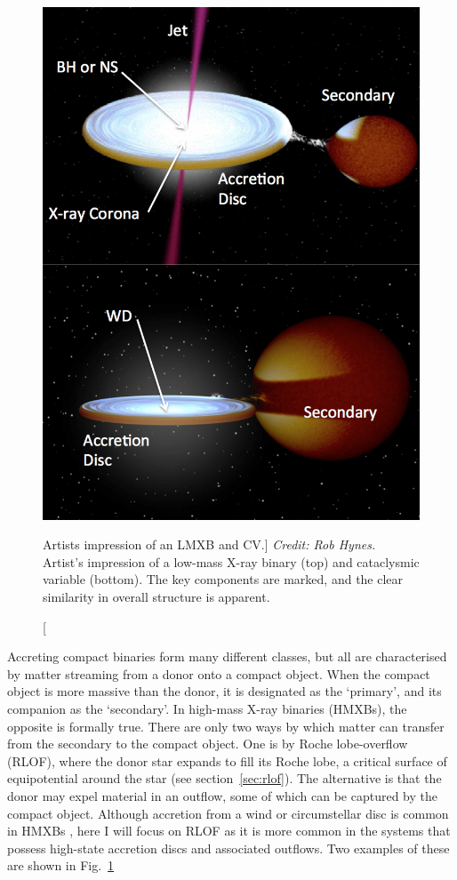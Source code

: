 \begin{figure}
\centering
\includegraphics[width=1.0\textwidth]{figures/01-intro/cv_and_xrb.png}
\caption
[Artists impression of an LMXB and CV.]
{
{\sl Credit: Rob Hynes.} 
Artist's impression of a low-mass X-ray binary (top) and
cataclysmic variable (bottom). The key components are marked,
and the clear similarity in overall structure is apparent.
} 
\label{fig:cv_and_xrb}
\end{figure}

Accreting compact binaries form many different classes, 
but all are characterised by matter streaming from a donor
onto a compact object. When the compact object is more massive 
than the donor, it is designated as the `primary', 
and its companion as the `secondary'. 
In high-mass X-ray binaries (HMXBs), the opposite is formally true.
There are only two ways by which matter can transfer 
from the secondary to the compact object. One is by Roche lobe-overflow (RLOF),
where the donor star expands to fill its Roche lobe, a critical surface
of equipotential around the star (see section~\ref{sec:rlof}). 
The alternative is that the donor may expel
material in an outflow, some of which can be captured by the compact object. 
Although accretion from a wind or circumstellar disc is common in 
HMXBs \citep{bartlett2013}, here I will focus on 
RLOF as it is more common in the systems that possess high-state accretion discs
and associated outflows. Two examples of these are shown in Fig.~\ref{fig:cv_and_xrb}


